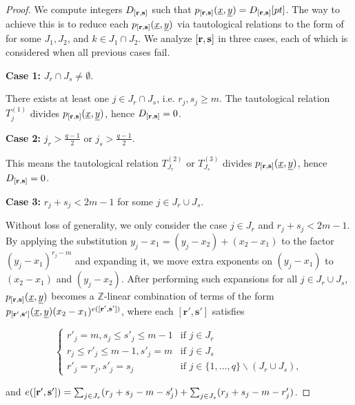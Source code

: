\documentclass[11pt]{article}
\begin{document}
\begin{proof}
    We compute integers \(D_{[\mathbf{r}, \mathbf{s}]}\) such that \(p_{[\mathbf{r}, \mathbf{s}]}(\underline{x}, \underline{y}) = D_{[\mathbf{r}, \mathbf{s}]} [pt]\). The way to achieve this is to reduce each \(p_{[\mathbf{r}, \mathbf{s}]}(\underline{x}, \underline{y})\) via tautological relations to the form of  for some \(J_1, J_2\), and \(k\in J_1\cap J_2\). We analyze \([\mathbf{r}, \mathbf{s}]\) in three cases, each of which is considered when all previous cases fail. 

    \textbf{Case 1:} \(J_r\cap J_s\neq \emptyset\).

    There exists at least one \(j\in J_r\cap J_s\), i.e. \(r_j, s_j\geq m\). The tautological relation \(T_j^{(1)}\) divides \(p_{[\mathbf{r}, \mathbf{s}]}(\underline{x}, \underline{y})\), hence \(D_{[\mathbf{r}, \mathbf{s}]} = 0\). 

    \textbf{Case 2:} \(j_r > \frac{q-1}{2}\) or \(j_s > \frac{q-1}{2}\).

    This means the tautological relation \(T_{J_r}^{(2)}\) or \(T_{J_s}^{(3)}\) divides \(p_{[\mathbf{r}, \mathbf{s}]}(\underline{x}, \underline{y})\), hence \(D_{[\mathbf{r}, \mathbf{s}]} = 0\). 

    \textbf{Case 3:} \(r_j + s_j < 2m-1\) for some \(j\in J_r\cup J_s\). 

    Without loss of generality, we only consider the case \(j\in J_r\) and \(r_j + s_j < 2m-1\). By applying the substitution \(y_j - x_1 = (y_j - x_2) + (x_2 - x_1)\) to the factor \((y_j - x_1)^{r_j - m}\) and expanding it, we move extra exponents on \((y_j - x_1)\) to \((x_2 - x_1)\) and \((y_j - x_2)\). After performing such expansions for all \(j\in J_r\cup J_s\), \(p_{[\mathbf{r}, \mathbf{s}]}(\underline{x}, \underline{y})\) becomes a \(\mathbb{Z}\)-linear combination of terms of the form \(p_{[\mathbf{r}', \mathbf{s}']}(\underline{x}, \underline{y})(x_2-x_1)^{e([\mathbf{r'}, \mathbf{s'}])}\), where each \([\mathbf{r}', \mathbf{s}']\) satisfies 
    
    \[
    \begin{cases}
        r'_j = m, s_j\leq s'_j\leq m-1 & \text{if }j\in J_r\\ 
        r_j\leq r'_j\leq m-1, s'_j = m & \text{if }j\in J_s\\ 
        r'_j = r_j, s'_j = s_j & \text{if }j\in \{1, \dots, q\}\backslash (J_r\cup J_s),
    \end{cases}
    \]

    and \(e([\mathbf{r'}, \mathbf{s'}]) = \sum_{j\in J_r}(r_j + s_j - m - s'_j) + \sum_{j\in J_s}(r_j + s_j - m - r'_j)\). 


\end{proof}
\end{document}
